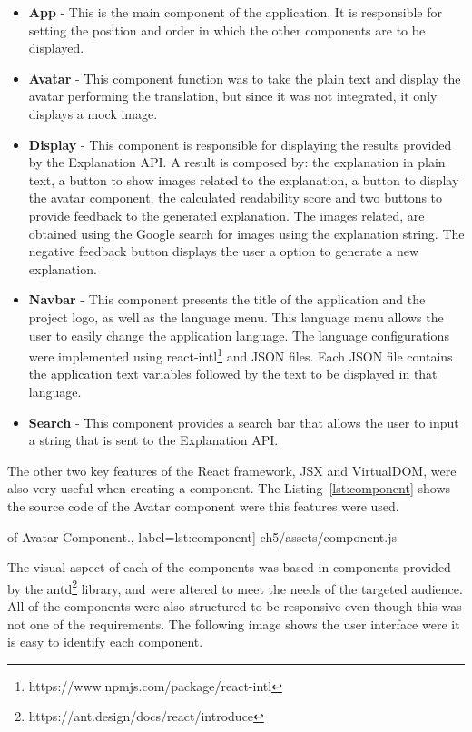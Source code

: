 \begin{itemize}
    \item \textbf{App} - This is the main component of the application.
        It is responsible for setting the position and order in which the other components are to be displayed.
    \item \textbf{Avatar} - This component function was to take the plain text and display the avatar performing the translation, but since it was not integrated, it only displays a mock image.
    \item \textbf{Display} - This component is responsible for displaying the results provided by the Explanation API.
        A result is composed by: the explanation in plain text, a button to show images related to the explanation, a button to display the avatar component, the calculated readability score and two buttons to provide feedback to the generated explanation.
        The images related, are obtained using the Google search for images using the explanation string.
        The negative feedback button displays the user a option to generate a new explanation.
    \item \textbf{Navbar} - This component presents the title of the application and the project logo, as well as the language menu.
        This language menu allows the user to easily change the application language.
        The language configurations were implemented using react-intl\footnote{https://www.npmjs.com/package/react-intl} and JSON files.
        Each JSON file contains the application text variables followed by the text to be displayed in that language.
    \item \textbf{Search} - This component provides a search bar that allows the user to input a string that is sent to the Explanation API.
\end{itemize}

The other two key features of the React framework, JSX and VirtualDOM, were also very useful when creating a component.
The Listing~\ref{lst:component} shows the source code of the Avatar component were this features were used.

\begin{center}
\begin{minipage}{0.95\linewidth}
 of Avatar Component.,
label=lst:component]
{ch5/assets/component.js}
\end{minipage}
\end{center}

The visual aspect of each of the components was based in components provided by the antd\footnote{https://ant.design/docs/react/introduce} library, and were altered to meet the needs of the targeted audience.
All of the components were also structured to be responsive even though this was not one of the requirements.
The following image shows the user interface were it is easy to identify each component.

